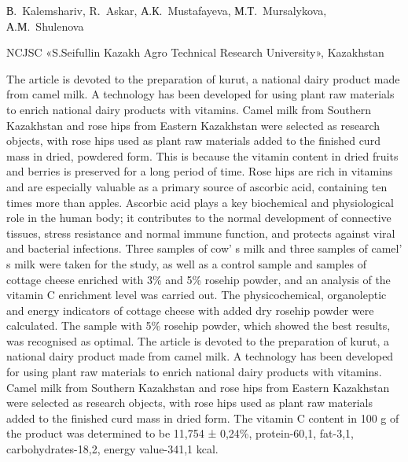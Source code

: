 
\begin{header}

В.~Kalemshariv,
R.~Askar,
А.К.~Mustafayeva\envelope,
М.Т.~Mursalykova,
А.М.~Shulenova
\end{header}

\begin{affil}
NCJSC «S.Seifullin Kazakh Agro Technical Research University», Kazakhstan

\end{affil}

The article is devoted to the preparation of kurut, a national dairy
product made from camel milk. A technology has been developed for using
plant raw materials to enrich national dairy products with vitamins.
Camel milk from Southern Kazakhstan and rose hips from Eastern
Kazakhstan were selected as research objects, with rose hips used as
plant raw materials added to the finished curd mass in dried, powdered
form. This is because the vitamin content in dried fruits and berries is
preserved for a long period of time. Rose hips are rich in vitamins and
are especially valuable as a primary source of ascorbic acid, containing
ten times more than apples. Ascorbic acid plays a key biochemical and
physiological role in the human body; it contributes to the normal
development of connective tissues, stress resistance and normal immune
function, and protects against viral and bacterial infections. Three
samples of cow' s milk and three samples of
camel' s milk were taken for the study, as well as a
control sample and samples of cottage cheese enriched with 3\% and 5\%
rosehip powder, and an analysis of the vitamin C enrichment level was
carried out. The physicochemical, organoleptic and energy indicators of
cottage cheese with added dry rosehip powder were calculated. The sample
with 5\% rosehip powder, which showed the best results, was recognised
as optimal. The article is devoted to the preparation of kurut, a
national dairy product made from camel milk. A technology has been
developed for using plant raw materials to enrich national dairy
products with vitamins. Camel milk from Southern Kazakhstan and rose
hips from Eastern Kazakhstan were selected as research objects, with
rose hips used as plant raw materials added to the finished curd mass in
dried form. The vitamin C content in 100 g of the product was determined
to be 11,754 ± 0,24\%, protein-60,1, fat-3,1, carbohydrates-18,2, energy
value-341,1 kcal.


